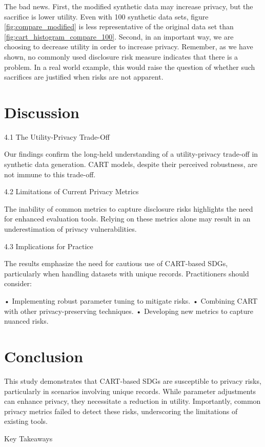 \documentclass[runningheads]{llncs}
\begin{document}
The bad news.  First, the modified synthetic data may increase privacy, but the sacrifice is lower utility.  Even with 100 synthetic data sets, figure \ref{fig:compare_modified} is less representative of the original data set than \ref{fig:cart_histogram_compare_100}.  Second, in an important way, we are choosing to decrease utility in order to increase privacy.  Remember, as we have shown, no commonly used disclosure risk measure indicates that there is a problem.  In a real world example, this would raise the question of whether such sacrifices are justified when risks are not apparent.

\section{Discussion}


4.1 The Utility-Privacy Trade-Off

Our findings confirm the long-held understanding of a utility-privacy trade-off in synthetic data generation. CART models, despite their perceived robustness, are not immune to this trade-off.

4.2 Limitations of Current Privacy Metrics

The inability of common metrics to capture disclosure risks highlights the need for enhanced evaluation tools. Relying on these metrics alone may result in an underestimation of privacy vulnerabilities.

4.3 Implications for Practice

The results emphasize the need for cautious use of CART-based SDGs, particularly when handling datasets with unique records. Practitioners should consider:

    •   Implementing robust parameter tuning to mitigate risks.
    •   Combining CART with other privacy-preserving techniques.
    •   Developing new metrics to capture nuanced risks.

\section{Conclusion}

This study demonstrates that CART-based SDGs are susceptible to privacy risks, particularly in scenarios involving unique records. While parameter adjustments can enhance privacy, they necessitate a reduction in utility. Importantly, common privacy metrics failed to detect these risks, underscoring the limitations of existing tools.

Key Takeaways
\end{document}
